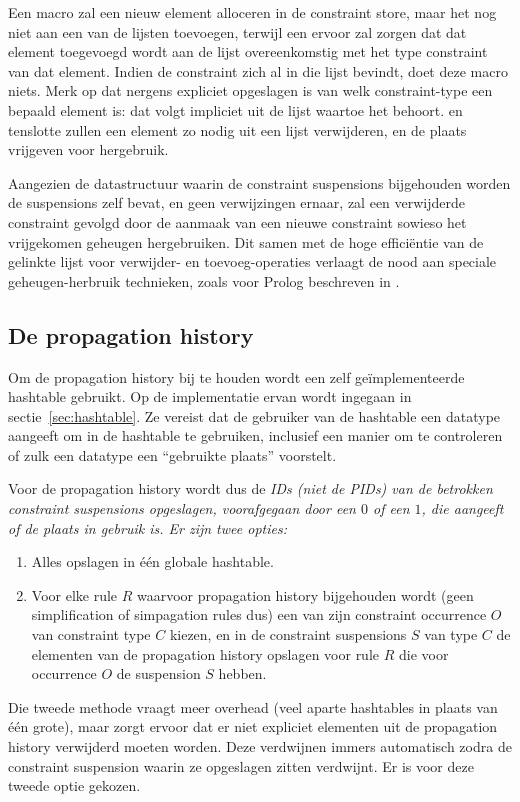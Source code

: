 Een  macro zal een nieuw element alloceren in de constraint store, maar het nog niet aan een van de lijsten toevoegen, terwijl een  ervoor zal zorgen dat dat element toegevoegd wordt aan de lijst overeenkomstig met het type constraint van dat element. Indien de constraint zich al in die lijst bevindt, doet deze macro niets. Merk op dat nergens expliciet opgeslagen is van welk constraint-type een bepaald element is: dat volgt impliciet uit de lijst waartoe het behoort.  en  tenslotte zullen een element zo nodig uit een lijst verwijderen, en de plaats vrijgeven voor hergebruik.

Aangezien de datastructuur waarin de constraint suspensions bijgehouden worden de suspensions zelf bevat, en geen verwijzingen ernaar, zal een verwijderde constraint gevolgd door de aanmaak van een nieuwe constraint sowieso het vrijgekomen geheugen hergebruiken. Dit samen met de hoge effici\"entie van de gelinkte lijst voor verwijder- en toevoeg-operaties verlaagt de nood aan speciale geheugen-herbruik technieken, zoals voor Prolog beschreven in \cite{jon:memory_reuse}.

\subsection{De propagation history} \label{sec:prophist}


Om de propagation history bij te houden wordt een zelf ge\"implementeerde hashtable gebruikt. Op de implementatie ervan wordt ingegaan in sectie~\ref{sec:hashtable}. Ze vereist dat de gebruiker van de hashtable een datatype aangeeft om in de hashtable te gebruiken, inclusief een manier om te controleren of zulk een datatype een ``gebruikte plaats'' voorstelt.

Voor de propagation history wordt dus de \em{ID}s (niet de \em{PID}s) van de betrokken constraint suspensions opgeslagen, voorafgegaan door een $0$ of een $1$, die aangeeft of de plaats in gebruik is. Er zijn twee opties: \begin{enumerate}
  \item Alles opslagen in \'e\'en globale hashtable.
  \item Voor elke rule $R$ waarvoor propagation history bijgehouden wordt (geen simplification of simpagation rules dus) een van zijn constraint occurrence $O$ van constraint type $C$ kiezen, en in de constraint suspensions $S$ van type $C$ de elementen van de propagation history opslagen voor rule $R$ die voor occurrence $O$ de suspension $S$ hebben.
\end{enumerate}
Die tweede methode vraagt meer overhead (veel aparte hashtables in plaats van \'e\'en grote), maar zorgt ervoor dat er niet expliciet elementen uit de propagation history verwijderd moeten worden. Deze verdwijnen immers automatisch zodra de constraint suspension waarin ze opgeslagen zitten verdwijnt. Er is voor deze tweede optie gekozen.

